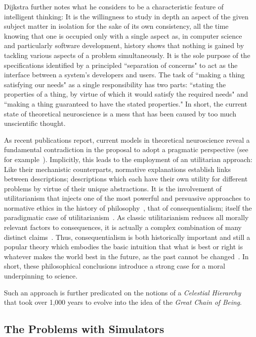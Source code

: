 \documentclass[10pt,letterpaper]{article}
\begin{document}
Dijkstra further notes what he considers to be a characteristic feature of intelligent thinking: It is the willingness to study in depth an aspect of the given subject matter in isolation for the sake of its own consistency, all the time knowing that one is occupied only with a single aspect as, in computer science and particularly software development, history shows that nothing is gained by tackling various aspects of a problem simultaneously. It is the sole purpose of the specifications identified by a principled ``separation of concerns" to act as the interface between a system's developers and users. The task of ``making a thing satisfying our needs" as a single responsibility has two parts: ``stating the properties of a thing, by virtue of which it would satisfy the required needs" and ``making a thing guaranteed to have the stated properties." In short, the current state of theoretical neuroscience is a mess that has been caused by too much unscientific thought.

As recent publications report, current models in theoretical neuroscience reveal a fundamental contradiction in the proposal to adopt a pragmatic perspective (see for example~\cite{levenstein23}). Implicitly, this leads to the employment of an utilitarian approach: Like their mechanistic counterparts, normative explanations establish links between descriptions; descriptions which each have their own utility for different problems by virtue of their unique abstractions. It is the involvement of utilitarianism that injects one of the most powerful and persuasive approaches to normative ethics in the history of philosophy~\cite{driver22}, that of consequentialism; itself the paradigmatic case of utilitarianism~\cite{sinnott-armstrong22}. As classic utilitarianism reduces all morally relevant factors to consequences, it is actually a complex combination of many distinct claims~\cite{sinnott-armstrong22}. Thus, consequentialism is both historically important and still a popular theory which embodies the basic intuition that what is best or right is whatever makes the world best in the future, as the past cannot be changed~\cite{sinnott-armstrong22}. In short, these philosophical conclusions introduce a strong case for a moral underpinning to science.

Such an approach is further predicated on the notions of a {\it{Celestial Hierarchy}} that took over 1,000 years to evolve into the idea of  the {\it{Great Chain of Being}}.

\subsection*{The Problems with Simulators}
\end{document}
